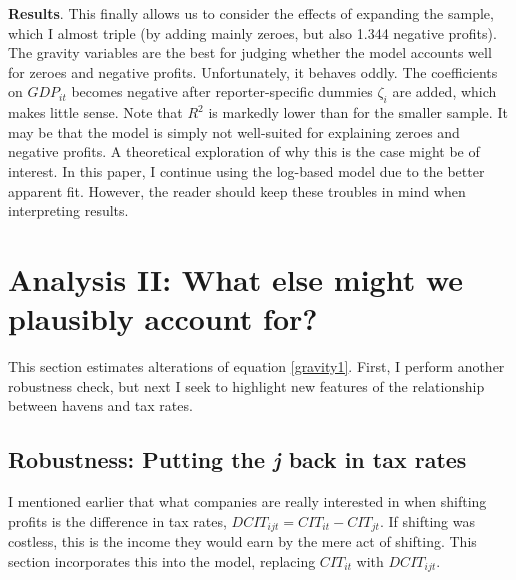 \documentclass[twoside,a4paper,11pt]{article}
\begin{document}
\textbf{Results}. This finally allows us to consider the effects of expanding the sample, which I almost triple (by adding mainly zeroes, but also 1.344 negative profits). The gravity variables are the best for judging whether the model accounts well for zeroes and negative profits. Unfortunately, it behaves oddly. The coefficients on $ GDP_{it} $ becomes negative after reporter-specific dummies $ \zeta_i $ are added, which makes little sense. Note that $ R^2 $ is markedly lower than for the smaller sample. It may be that the model is simply not well-suited for explaining zeroes and negative profits. A theoretical exploration of why this is the case might be of interest. In this paper, I continue using the log-based model due to the better apparent fit. However, the reader should keep these troubles in mind when interpreting results. 

\section{Analysis II: What else might we plausibly account for?}
This section estimates alterations of equation \ref{gravity1}. First, I perform another robustness check, but next I seek to highlight new features of the relationship between havens and tax rates. 

\subsection{Robustness: Putting the \textit{j} back in tax rates}\label{sectaxdiff}
I mentioned earlier that what companies are really interested in when shifting profits is the difference in tax rates, $ DCIT_{ijt}=CIT_{it}-CIT_{jt} $. If shifting was costless, this is the income they would earn by the mere act of shifting. This section incorporates this into the model, replacing $ CIT_{it} $ with $ DCIT_{ijt} $. 
\end{document}
